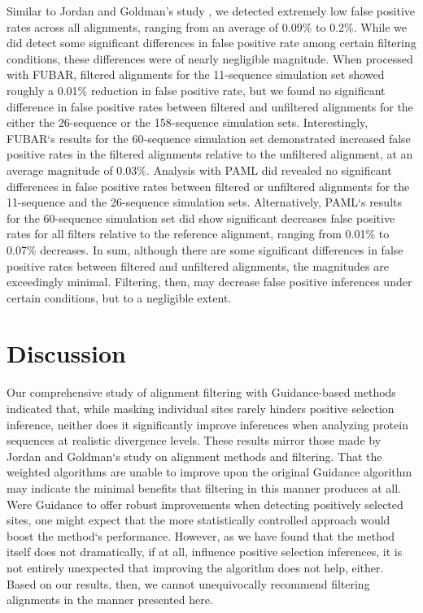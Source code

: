 \documentclass[10pt]{article}
\begin{document}
Similar to Jordan and Goldman's study \citep{Jordan2011}, we detected extremely low false positive rates across all alignments, ranging from an average of 0.09\% to 0.2\%. While we did detect some significant differences in false positive rate among certain filtering conditions, these differences were of nearly negligible magnitude. When processed with FUBAR, filtered alignments for the 11-sequence simulation set showed roughly a 0.01\% reduction in false positive rate, but we found no significant difference in false positive rates between filtered and unfiltered alignments for the either the 26-sequence or the 158-sequence simulation sets. 
Interestingly, FUBAR`s results for the 60-sequence simulation set demonstrated increased false positive rates in the filtered alignments relative to the unfiltered alignment, at an average magnitude of 0.03\%. Analysis with PAML did revealed no significant differences in false positive rates between filtered or unfiltered alignments for the 11-sequence and the 26-sequence simulation sets. Alternatively, PAML`s results for the 60-sequence simulation set did show significant decreases false positive rates for all filters relative to the reference alignment, ranging from 0.01\% to 0.07\% decreases. In sum, although there are some significant differences in false positive rates between filtered and unfiltered alignments, the magnitudes are exceedingly minimal. Filtering, then, may decrease false positive inferences under certain conditions, but to a negligible extent.

\section*{Discussion}

Our comprehensive study of alignment filtering with Guidance-based methods indicated that, while masking individual sites rarely hinders positive selection inference, neither does it significantly improve inferences when analyzing protein sequences at realistic divergence levels. These results mirror those made by Jordan and Goldman`s \citep{Jordan2011} study on alignment methods and filtering. That the weighted algorithms are unable to improve upon the original Guidance algorithm may indicate the minimal benefits that filtering in this manner produces at all. Were Guidance to offer robust improvements when detecting positively selected sites, one might expect that the more statistically controlled approach would boost the method`s performance. However, as we have found that the method itself does not dramatically, if at all, influence positive selection inferences, it is not entirely unexpected that improving the algorithm does not help, either. Based on our results, then, we cannot unequivocally recommend filtering alignments in the manner presented here. 
\end{document}
